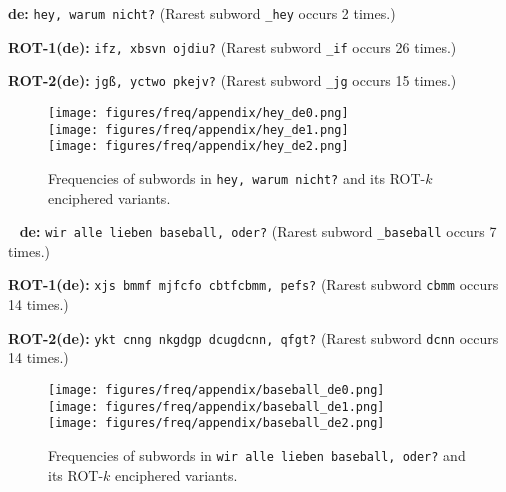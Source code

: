 \documentclass[11pt]{article}
\begin{document}
\noindent
\textbf{de:}
\texttt{hey, warum nicht?} (Rarest subword \texttt{\_hey} occurs 2 times.)

\noindent
\textbf{ROT-1(de):}
\texttt{ifz, xbsvn ojdiu?} (Rarest subword \texttt{\_if} occurs 26 times.)

\noindent
\textbf{ROT-2(de):}
\texttt{jgß, yctwo pkejv?} (Rarest subword \texttt{\_jg} occurs 15 times.)

\begin{figure}[hbt]
    \centering
    \texttt{[image: figures/freq/appendix/hey\_de0.png]}\\[0.3em]
    \texttt{[image: figures/freq/appendix/hey\_de1.png]}\\[0.3em]
    \texttt{[image: figures/freq/appendix/hey\_de2.png]}\\
\caption{Frequencies of subwords in \texttt{hey, warum nicht?} and its ROT-$k$ enciphered variants.}
\end{figure}

\
\noindent
\textbf{de:}
\texttt{wir alle lieben baseball, oder?} (Rarest subword \texttt{\_baseball} occurs 7 times.)

\noindent
\textbf{ROT-1(de):}
\texttt{xjs bmmf mjfcfo cbtfcbmm, pefs?} (Rarest subword \texttt{cbmm} occurs 14 times.)

\noindent
\textbf{ROT-2(de):}
\texttt{ykt cnng nkgdgp dcugdcnn, qfgt?} (Rarest subword \texttt{dcnn} occurs 14 times.)

\begin{figure}[!ht]
    \centering
    \texttt{[image: figures/freq/appendix/baseball\_de0.png]}\\[0.3em]
    \texttt{[image: figures/freq/appendix/baseball\_de1.png]}\\[0.3em]
    \texttt{[image: figures/freq/appendix/baseball\_de2.png]}\\
\caption{Frequencies of subwords in \texttt{wir alle lieben baseball, oder?} and its ROT-$k$ enciphered variants.}
\end{figure}
\end{document}
